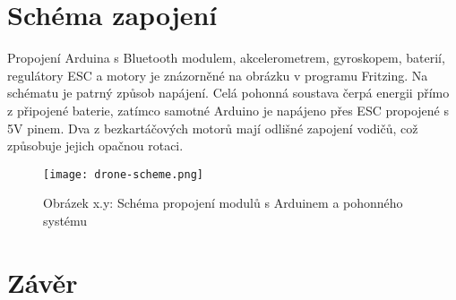 \documentclass[12pt]{report}
\begin{document}
\chapter{Schéma zapojení}
Propojení Arduina s Bluetooth modulem, akcelerometrem, gyroskopem, baterií, regulátory ESC a motory je znázorněné na obrázku v programu Fritzing. Na schématu je patrný způsob napájení. Celá pohonná soustava čerpá energii přímo z připojené baterie, zatímco samotné Arduino je napájeno přes ESC propojené s 5V pinem. Dva z bezkartáčových motorů mají odlišné zapojení vodičů, což způsobuje jejich opačnou rotaci.

\vspace{40pt}
\begin{figure}[H]
	\centering
	\texttt{[image: drone-scheme.png]}
	\caption{Obrázek x.y: Schéma propojení modulů s Arduinem a pohonného systému}
	\label{fig:drone-scheme.png}
  \end{figure}

\chapter*{Závěr}
	
\lipsum[1]
	
\nocite{*}
\printbibliography					%
\printglossary[title={Zkratky}]		%
\listoffigures						%
\end{document}
